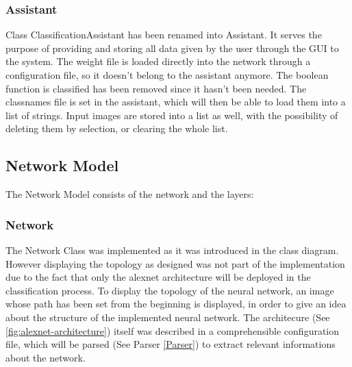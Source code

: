 \documentclass[parskip=full]{scrartcl}
\newcommand\tab[1][1cm]{\hspace*{#1}}
\begin{document}
	\subsubsection {Assistant}
	\tab Class ClassificationAssistant has been renamed into Assistant. It serves the purpose of providing and storing all data given by the user through the GUI to the system. The weight file is loaded directly into the network through a configuration file, so it doesn't belong to the assistant anymore. The boolean function is classified has been removed since it hasn't been needed. The classnames file is set in the assistant, which will then be able to load them into a list of strings. Input images are stored into a list as well, with the possibility of deleting them by selection, or clearing the whole list.

	\subsection {Network Model}
	\tab The Network Model consists of the network and the layers:
	
		\subsubsection {Network}
		\tab The Network Class was implemented as it was introduced in the class diagram. However displaying the topology  as designed was not part of the implementation due to the fact that only the alexnet architecture will be deployed in the classification process. To display the topology of the neural network, an image whose path has been set from the beginning is displayed, in order to give an idea about the structure of the implemented neural network.
		The architecure (See \ref{fig:alexnet-architecture}) itself was described in a comprehensible configuration file, which will be parsed (See Parser \ref{Parser}) to extract relevant informations about the network.
		
\end{document}
